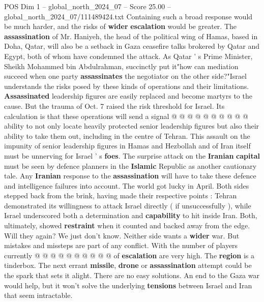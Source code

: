 \begin{textsample}{POS Dim 1 – global\_north\_2024\_07 – Score 25.00 – global\_north\_2024\_07/111489424.txt}
Containing such a broad response would be much harder, and the risks of \textbf{wider} \textbf{escalation} would be greater.
The \textbf{assassination} of Mr.
Haniyeh, the head of the political wing of Hamas, based in Doha, Qatar, will also be a setback in Gaza ceasefire talks brokered by Qatar and Egypt, both of whom have condemned the attack.
As Qatar ' s Prime Minister, Sheikh Mohammed bin Abdulrahman, succinctly put it"how can mediation succeed when one party \textbf{assassinates} the negotiator on the other side?"Israel understands the risks posed by these kinds of operations and their limitations. \textbf{Assassinated} leadership figures are easily replaced and become martyrs to the cause.
But the trauma of Oct. 7 raised the risk threshold for Israel.
Its calculation is that these operations will send a signal @ @ @ @ @ @ @ @ @ @ ability to not only locate heavily protected senior leadership figures but also their ability to take them out, including in the centre of Tehran.
This assault on the impunity of senior leadership figures in Hamas and Hezbollah and of Iran itself must be unnerving for Israel ' s \textbf{foes}.
The surprise attack on the \textbf{Iranian} \textbf{capital} must be seen by defence planners in the \textbf{Islamic} Republic as another cautionary tale.
Any \textbf{Iranian} response to the \textbf{assassination} will have to take these defence and intelligence failures into account.
The world got lucky in April.
Both sides stepped back from the brink, having made their respective points : Tehran demonstrated its willingness to attack Israel directly ( if unsuccessfully ), while Israel underscored both a determination and \textbf{capability} to hit inside Iran.
Both, ultimately, showed \textbf{restraint} when it counted and backed away from the edge.
Will they again?
We just don't know.
Neither side wants a \textbf{wider} war.
But mistakes and missteps are part of any conflict.
With the number of players currently @ @ @ @ @ @ @ @ @ @ of \textbf{escalation} are very high.
The \textbf{region} is a tinderbox.
The next errant \textbf{missile}, \textbf{drone} or \textbf{assassination} attempt could be the spark that sets it alight.
There are no easy solutions.
An end to the Gaza war would help, but it won't solve the underlying \textbf{tensions} between Israel and Iran that seem intractable.

\end{textsample}

